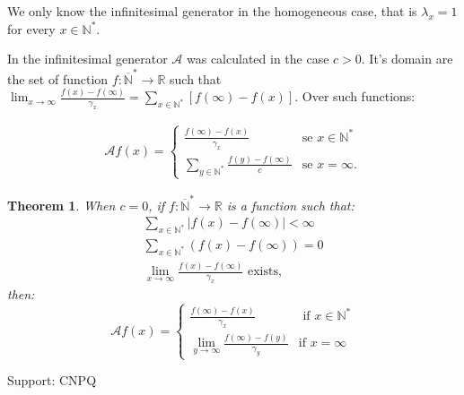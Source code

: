 \documentclass[a1,portrait]{a0poster}
\newtheorem{teorema}{Theorem}
\newcommand{\AAA}{{\mathcal{A}}}
\newcommand{\Nz}{{\mathbb{N^*}}}
\newcommand{\Nzb}{{\mathbb{\overline{N}^*}}}
\newcommand{\R}{{\mathbb{R}}}
\begin{document}
\begin{textblock}{15}
We only know the infinitesimal generator in the homogeneous case, that
is $\lambda_x = 1$ for every $x \in \Nz$.

In \cite{kendall:56} the infinitesimal generator $\AAA$ was calculated
in the case $c > 0$. It's domain are the set of function $f: \Nzb \to
\R$ such that $\lim_{x \to \infty} \frac{f(x) - f(\infty)}{\gamma_x} =
\sum_{x \in \Nz} [f(\infty) - f(x)]$. Over such functions:

\begin{align*}
  \AAA f (x) = \begin{cases}
    \displaystyle
    \frac{f(\infty) - f(x)}{\gamma_x} & \text{se } x \in \Nz\\
    \displaystyle
    \sum_{y\in \Nz} \frac{f(y) - f(\infty)}{c} & \text{se } x = \infty.
  \end{cases}
\end{align*}


\begin{teorema}
  When $c = 0$, if $f: \Nzb \to \R$ is a function such that: 
  \begin{gather}
    \sum_{x\in \Nz} |f(x)-f(\infty)| < \infty\\
    \sum_{x\in \Nz} \left( f(x)-f(\infty)\right) = 0\\
    \lim_{x \to \infty} \frac{f(x) - f(\infty)}{\gamma_x} \textrm{ exists},
  \end{gather}
  then:
  \begin{displaymath}
    \AAA f(x) = \begin{cases}
      \frac{f(\infty)- f(x)}{\gamma_x} & \text{ if } x \in \Nz \\
      \lim_{y \to \infty} \frac{f(\infty) - f(y)}{\gamma_y} & \text{
        if } x = \infty
    \end{cases}  
  \end{displaymath}
\end{teorema}

\nocite{fontes:08}
\nocite{gabriel:11}



Support: CNPQ


\end{textblock}
\end{document}
